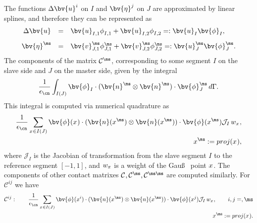 The functions $\Delta \bv{u}^i$ on $I$ and $\bv{\eta}^j$ on $J$ are approximated by linear splines, and therefore they can be represented as
\begin{equation*}
\begin{array}{rcl}
\Delta \bv{u}^{\sl} &=& \bv{u}_{I,1}^{\sl} \phi^{\sl}_{I,1} + \bv{u}_{I,2}^{\sl} \phi^{\sl}_{I,2} =: \bv{u}_I^{\sl} \bv{\phi}^{\sl}_I ,\\[2ex]
\bv{\eta}^{\ms} &=& \bv{v}_{J,1}^{\ms} \phi^{\ms}_{J,1} + \bv{v}_{J,2}^{\ms} \phi^{\ms}_{J,2} =: \bv{u}_J^{\ms} \bv{\phi}^{\ms}_J.
\end{array}
\end{equation*}
The components of the matrix $\mathcal{C}^{\sl \ms}$, corresponding to some segment $I$ on the slave side and $J$ on the master side, given by the integral
\begin{align*}
{\frac{1}{\epsilon_{\cn}}} \int_{I(J)} \bv{\phi}^{\sl}_I \cdot (\bv{n}^{\ms} \otimes \bv{n}^{\ms}) \cdot \bv{\phi}^{\ms}_J \, d\Gamma.
\end{align*}
This integral is computed via numerical quadrature as
\begin{align*}
{\frac{1}{\epsilon_{\cn}}} \sum_{x^{\sl} \in I(J)} \bv{\phi}(x^{\sl}) \cdot (\bv{n}(x^{\ms}) \otimes \bv{n}(x^{\ms})) \cdot \bv{\phi}(x^{\ms}) \mathcal{J}_I \, w_{x^{\sl}}, \\
x^{\ms} := proj(x^{\sl}),
\end{align*}
where $\mathcal{J}_I$ is the Jacobian of transformation from the slave segment $I$ to the reference segment $[-1,1]$, and $w_{x^{\sl}}$ is a weight of the Gau\ss ~ point $x^{\sl}$.
The components of other contact matrixes $\mathcal{C}^{\sl \sl}, \mathcal{C}^{\ms \sl}, \mathcal{C}^{\ms \ms}$ are computed similarly. For $\mathcal{C}^{ij}$ we have
\begin{align*}
\mathcal{C}^{ij}: \qquad {\frac{1}{\epsilon_{\cn}}} \sum_{x^{\sl} \in I(J)} \bv{\phi}(x^i) \cdot (\bv{n}(x^{\ms}) \otimes \bv{n}(x^{\ms})) \cdot \bv{\phi}(x^j) \mathcal{J}_I \, w_{x^{\sl}}, \qquad i,j=\sl,\ms\\
x^{\ms} := proj(x^{\sl}).
\end{align*}


